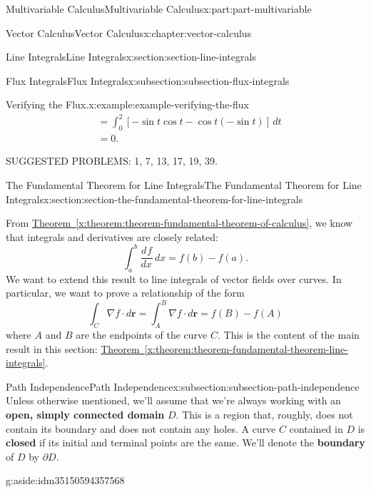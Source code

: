 \documentclass[twoside,10pt,]{tufte-book}
\newcommand{\xreffont}{\relax}
\newcommand{\terminology}[1]{\textbf{#1}}
\numberwithin{equation}{part}
\newcommand{\grad}{\nabla}
\newcommand{\vb}[1]{\mathbf{#1}}
\newcommand{\dv}[3][]{\dfrac{d^{#1} #2}{d #3^{#1}}}
\newcommand{\brackets}[1]{\left[ #1 \right]}
\newcommand{\amp}{&}
\begin{document}
\begin{partptx}{Multivariable Calculus}{}{Multivariable Calculus}{}{}{x:part:part-multivariable}
\begin{chapterptx}{Vector Calculus}{}{Vector Calculus}{}{}{x:chapter:vector-calculus}
\begin{sectionptx}{Line Integrals}{}{Line Integrals}{}{}{x:section:section-line-integrals}
\begin{subsectionptx}{Flux Integrals}{}{Flux Integrals}{}{}{x:subsection:subsection-flux-integrals}
\begin{example}{Verifying the Flux.}{x:example:example-verifying-the-flux}
\begin{align*}
\amp = \int_{0}^{2}\brackets{-\sin t\cos t - \cos t(-\sin t)}\,dt \\
\amp = 0 \text{.}
\end{align*}
%
\end{example}
\end{subsectionptx}
\begin{conclusion}{}%
SUGGESTED PROBLEMS: 1, 7, 13, 17, 19, 39.%
\end{conclusion}%
\end{sectionptx}
%
%
\typeout{************************************************}
\typeout{************************************************}
%
\begin{sectionptx}{The Fundamental Theorem for Line Integrals}{}{The Fundamental Theorem for Line Integrals}{}{}{x:section:section-the-fundamental-theorem-for-line-integrals}
\begin{introduction}{}%
From \hyperref[x:theorem:theorem-fundamental-theorem-of-calculus]{Theorem~{\xreffont\ref{x:theorem:theorem-fundamental-theorem-of-calculus}}}, we know that integrals and derivatives are closely related:%
\begin{equation*}
\int_{a}^{b}\dv{f}{x}\,dx = f(b) - f(a)\text{.}
\end{equation*}
We want to extend this result to line integrals of vector fields over curves. In particular, we want to prove a relationship of the form%
\begin{equation*}
\int_{C}\grad f\cdot d\vb{r} = \int_{A}^{B}\grad f\cdot d\vb{r} = f(B) - f(A)
\end{equation*}
where \(A\) and \(B\) are the endpoints of the curve \(C\). This is the content of the main result in this section: \hyperref[x:theorem:theorem-fundamental-theorem-line-integrals]{Theorem~{\xreffont\ref{x:theorem:theorem-fundamental-theorem-line-integrals}}}.%
\end{introduction}%
%
%
\typeout{************************************************}
\typeout{************************************************}
%
\begin{subsectionptx}{Path Independence}{}{Path Independence}{}{}{x:subsection:subsection-path-independence}
Unless otherwise mentioned, we'll assume that we're always working with an \terminology{open, simply connected domain} \(D\). This is a region that, roughly, does not contain its boundary and does not contain any holes. A curve \(C\) contained in \(D\) is \terminology{closed} if its initial and terminal points are the same. We'll denote the \terminology{boundary} of \(D\) by \(\partial D\). \begin{aside}{}{g:aside:idm35150594357568}%

\end{aside}
\end{subsectionptx}
\end{sectionptx}
\end{chapterptx}
\end{partptx}
\end{document}

